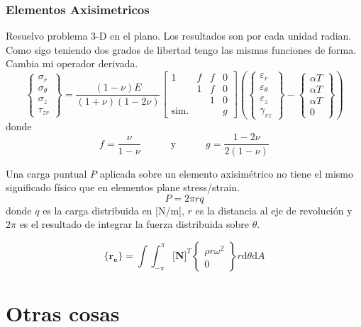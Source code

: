 \documentclass[11pt, a4paper,titlepage]{article}
\newcommand{\unspace}{\!\!\!\!\!\!\!\!\!\!\!\!\!\!\!\!\!\!\!\!}
\newcommand{\di}{\textrm{d}}
\newcommand{\Mme}[1]{\boldsymbol{[}\mathbf{#1} \boldsymbol{]}}
\newcommand{\Cme}[1]{\boldsymbol{\{ }\mathbf{#1} \boldsymbol{\}} }
\newcommand{\MN}{\Mme{N}}
\newcommand{\radial}{r}
\newcommand{\eff}{f}
\begin{document}
\section{Elementos Axisimetricos}
Resuelvo problema 3-D en el plano. Los resultados son por cada unidad radian. Como sigo teniendo dos grados de libertad tengo las mismas funciones de forma. Cambia mi operador derivada.
\[
\begin{Bmatrix}
    \sigma_\radial \\
    \sigma_\theta \\
    \sigma_z \\
    \tau_{z\radial}
\end{Bmatrix}
= \frac{(1-\nu)E}{(1+\nu)(1-2\nu)}
\begin{bmatrix}
   1 & \eff & \eff & 0 \\
    & 1 & \eff & 0 \\
    & & 1 & 0 \\
    \textrm{sim.}\unspace& & & g 
\end{bmatrix}
\left(
\begin{Bmatrix}
\varepsilon_\radial \\
\varepsilon_\theta \\
\varepsilon_z \\
\gamma_{\radial z}
\end{Bmatrix}
-
\begin{Bmatrix}
\alpha T\\
\alpha T \\
\alpha T \\
0
\end{Bmatrix}
\right)
\]
donde 
\[
f=\frac{\nu}{1-\nu}\qquad \quad \textrm{y}\quad \qquad g=\frac{1-2\nu}{2(1-\nu)}
\]

Una carga puntual $P$ aplicada sobre un elemento axisimétrico no tiene el mismo significado físico que en elementos plane stress/strain. 
\[
P=2\pi rq
\]
donde $q$ es la carga distribuida en [N/m], $r$ es la distancia al eje de revolución y $2 \pi$ es el resultado de integrar la fuerza distribuida sobre $\theta$. 

\[
\Cme{r_e} = \int\int_{-\pi}^{\pi} \MN^T \begin{Bmatrix}
    \rho r \omega ^2 \\
    0
\end{Bmatrix} r \di \theta \di A
\]
\part{Otras cosas}
\end{document}

